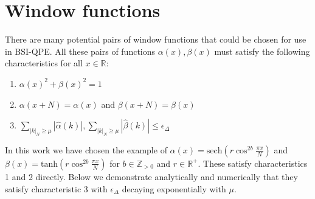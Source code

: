 \documentclass[aps,floatfix,10pt,amssymb,amsfont,amsmath,superscriptaddress,float,nofootinbib,longbibliography,nobalancelastpage,twocolumn]{revtex4-2}
\begin{document}
\section{Window functions}
\label{section:appendix}
There are many potential pairs of window functions that could be chosen for use in BSI-QPE. All these pairs of functions $\alpha(x), \beta(x)$ must satisfy the following characteristics for all $x \in \mathbb{R}$:
\begin{enumerate}
    \item $\alpha(x)^2+\beta(x)^2 =1$
    \item $\alpha(x+N) = \alpha(x)$ and $\beta(x+N) = \beta(x)$
    \item $\sum_{|k|_{N}\geq\mu}|\hat \alpha(k)|, \sum_{|k|_{N}\geq\mu}|\hat \beta(k)| \leq \epsilon_\Delta$
\end{enumerate}
In this work we have chosen the example of $\alpha(x) = \text{sech}( r\cos^{2b} \frac{\pi x}{N})$ and $\beta(x) = \text{tanh}(r \cos^{2b} \frac{\pi x}{N})$ for $b \in \mathbb{Z}_{>0}$ and $r \in \mathbb{R}^+$. These satisfy characteristics 1 and 2 directly. Below we demonstrate analytically and numerically that they satisfy characteristic 3 with $\epsilon_{\Delta}$ decaying exponentially with $\mu$.
\end{document}
